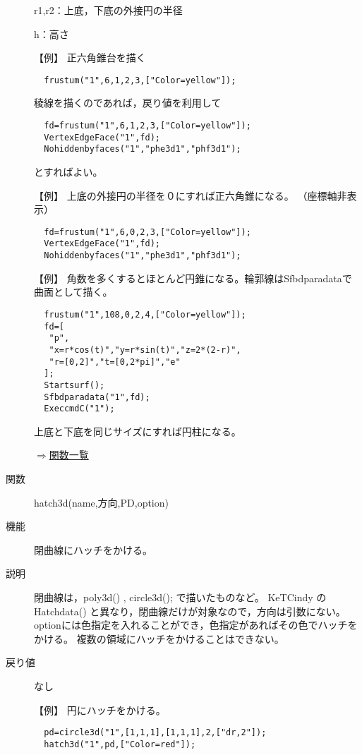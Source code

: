 \documentclass[papersize,a4paper,12pt,uplatex]{jsarticle}
\begin{document}
\begin{description}
r1,r2：上底，下底の外接円の半径

h：高さ

\vspace{\baselineskip}
 【例】 正六角錐台を描く 

\verb|  frustum("1",6,1,2,3,["Color=yellow"]);| 

\hspace{20mm}

稜線を描くのであれば，戻り値を利用して
\begin{verbatim}
  fd=frustum("1",6,1,2,3,["Color=yellow"]);
  VertexEdgeFace("1",fd);
  Nohiddenbyfaces("1","phe3d1","phf3d1");
\end{verbatim}
とすればよい。

 【例】 上底の外接円の半径を０にすれば正六角錐になる。 （座標軸非表示）

\begin{verbatim}
  fd=frustum("1",6,0,2,3,["Color=yellow"]);
  VertexEdgeFace("1",fd);
  Nohiddenbyfaces("1","phe3d1","phf3d1");
\end{verbatim}

\hspace{20mm}

 【例】 角数を多くするとほとんど円錐になる。輪郭線はSfbdparadataで曲面として描く。
 
\begin{verbatim}
  frustum("1",108,0,2,4,["Color=yellow"]);
  fd=[
   "p",
   "x=r*cos(t)","y=r*sin(t)","z=2*(2-r)",
   "r=[0,2]","t=[0,2*pi]","e"
  ];
  Startsurf(); 
  Sfbdparadata("1",fd);
  ExeccmdC("1");
\end{verbatim}

\hspace{20mm}

上底と下底を同じサイズにすれば円柱になる。

\begin{flushright} \hyperlink{functionlist}{$\Rightarrow$関数一覧}\end{flushright}

\hypertarget{hatch3d}{}\item[関数] hatch3d(name,方向,PD,option)
\item[機能] 閉曲線にハッチをかける。
\item[説明] 閉曲線は，poly3d() , circle3d(); で描いたものなど。 
KeTCindy のHatchdata() と異なり，閉曲線だけが対象なので，方向は引数にない。optionには色指定を入れることができ，色指定があればその色でハッチをかける。 複数の領域にハッチをかけることはできない。
\item[戻り値] なし

【例】 円にハッチをかける。 
\begin{verbatim}
  pd=circle3d("1",[1,1,1],[1,1,1],2,["dr,2"]); 
  hatch3d("1",pd,["Color=red"]); 
\end{verbatim}

  

\newpage
\end{description}
\end{document}
